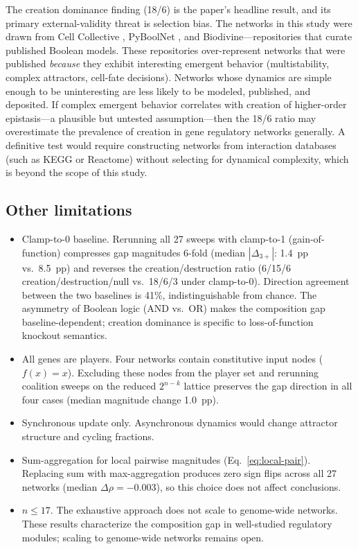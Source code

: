 \documentclass[10pt]{article}
\begin{document}
The creation dominance finding (18/6) is the paper's headline result,
and its primary external-validity threat is selection bias.
The networks in this study were drawn from Cell Collective
\citep{helikar2012cell}, PyBoolNet \citep{klarner2017pyboolnet}, and
Biodivine---repositories that curate published Boolean models. These
repositories over-represent networks that were published \emph{because}
they exhibit interesting emergent behavior (multistability, complex
attractors, cell-fate decisions). Networks whose dynamics are simple
enough to be uninteresting are less likely to be modeled, published,
and deposited. If complex emergent behavior correlates with creation
of higher-order epistasis---a plausible but untested assumption---then
the 18/6 ratio may overestimate the prevalence of creation in gene
regulatory networks generally. A definitive test would require
constructing networks from interaction databases (such as KEGG or
Reactome) without selecting for dynamical complexity, which is beyond
the scope of this study.

\subsection{Other limitations}

\begin{itemize}
\item Clamp-to-0 baseline. Rerunning all 27 sweeps with
  clamp-to-1 (gain-of-function) compresses gap magnitudes 6-fold
  (median $|\Delta_{3+}|$: 1.4~pp vs.\ 8.5~pp) and reverses the
  creation/destruction ratio (6/15/6 creation/destruction/null vs.\
  18/6/3 under clamp-to-0). Direction agreement between the two
  baselines is 41\%, indistinguishable from chance. The asymmetry of
  Boolean logic (AND vs.\ OR) makes the composition gap
  baseline-dependent; creation dominance is specific to
  loss-of-function knockout semantics.
\item All genes are players. Four networks contain constitutive
  input nodes ($f(x) = x$). Excluding these nodes from the player set
  and rerunning coalition sweeps on the reduced $2^{n-k}$ lattice
  preserves the gap direction in all four cases (median magnitude
  change 1.0~pp).
\item Synchronous update only. Asynchronous dynamics would change
  attractor structure and cycling fractions.
\item Sum-aggregation for local pairwise magnitudes
  (Eq.~\ref{eq:local-pair}). Replacing sum with max-aggregation
  produces zero sign flips across all 27 networks (median $\Delta\rho
  = -0.003$), so this choice does not affect conclusions.
\item $n \leq 17$. The exhaustive approach does not scale to
  genome-wide networks. These results characterize the composition
  gap in well-studied regulatory modules; scaling to genome-wide
  networks remains open.
\end{itemize}
\end{document}
